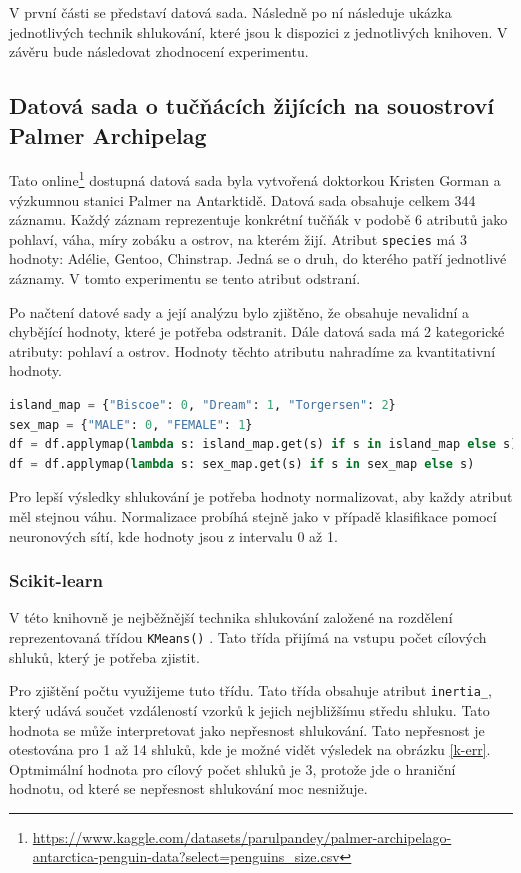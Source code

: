 V první části se představí datová sada. Následně po ní následuje ukázka jednotlivých technik shlukování, které jsou k dispozici z jednotlivých knihoven.
V závěru bude následovat zhodnocení experimentu.

\subsection*{Datová sada o tučňácích žijících na souostroví Palmer Archipelag}
Tato online\footnote{\url{https://www.kaggle.com/datasets/parulpandey/palmer-archipelago-antarctica-penguin-data?select=penguins_size.csv}} dostupná datová sada byla vytvořená doktorkou Kristen Gorman a výzkumnou stanici Palmer na Antarktidě. Datová sada obsahuje celkem 344 záznamu. Každý záznam reprezentuje konkrétní tučňák v podobě 6 atributů jako pohlaví, váha, míry zobáku a ostrov, na kterém žijí. Atribut \verb|species| má 3 hodnoty: Adélie, Gentoo, Chinstrap. Jedná se o druh, do kterého patří jednotlivé záznamy. V tomto experimentu se tento atribut odstraní.

Po načtení datové sady a její analýzu bylo zjištěno, že obsahuje nevalidní a chybějící hodnoty, které je potřeba odstranit. Dále datová sada má 2 kategorické atributy: pohlaví a ostrov. Hodnoty těchto atributu nahradíme za kvantitativní hodnoty.

\begin{mdframed}
\begin{lstlisting}[language=Python]
island_map = {"Biscoe": 0, "Dream": 1, "Torgersen": 2}
sex_map = {"MALE": 0, "FEMALE": 1}
df = df.applymap(lambda s: island_map.get(s) if s in island_map else s)
df = df.applymap(lambda s: sex_map.get(s) if s in sex_map else s)
\end{lstlisting}   
\end{mdframed}

Pro lepší výsledky shlukování je potřeba hodnoty normalizovat, aby každy atribut měl stejnou váhu. Normalizace probíhá stejně jako v případě klasifikace pomocí neuronových sítí, kde hodnoty jsou z intervalu 0 až 1.

\subsubsection*{Scikit-learn}
V této knihovně je nejběžnější technika shlukování založené na rozdělení reprezentovaná třídou \verb|KMeans()| . Tato třída přijímá na vstupu počet cílových shluků, který je potřeba zjistit. 

Pro zjištění počtu využijeme tuto třídu. Tato třída obsahuje atribut \verb|inertia_|, který udává součet vzdáleností vzorků k jejich nejbližšímu středu shluku. Tato hodnota se může interpretovat jako nepřesnost shlukování. Tato nepřesnost je otestována pro 1 až 14 shluků, kde je možné vidět výsledek na obrázku \ref{k-err}. Optmimální hodnota pro cílový počet shluků je 3, protože jde o hraniční hodnotu, od které se nepřesnost shlukování moc nesnižuje.

